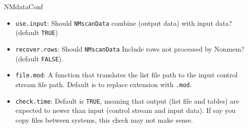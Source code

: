 \documentclass[
  8pt,
  ignorenonframetext,
  aspectratio=169]{beamer}
\begin{document}
\begin{frame}[fragile]{NMdataConf}
\begin{itemize}
\item
  \texttt{use.input}: Should \texttt{NMscanData} combine (output data)
  with input data? (default \texttt{TRUE})
\item
  \texttt{recover.rows}: Should \texttt{NMscanData} Include rows not
  processed by Nonmem? (default \texttt{FALSE}).
\item
  \texttt{file.mod}: A function that translates the list file path to
  the input control stream file path. Default is to replace extension
  with \texttt{.mod}.
\item
  \texttt{check.time}: Default is \texttt{TRUE}, meaning that output
  (list file and tables) are expected to newer than input (control
  stream and input data). If say you copy files between systems, this
  check may not make sense.
\end{itemize}
\end{frame}
\end{document}
